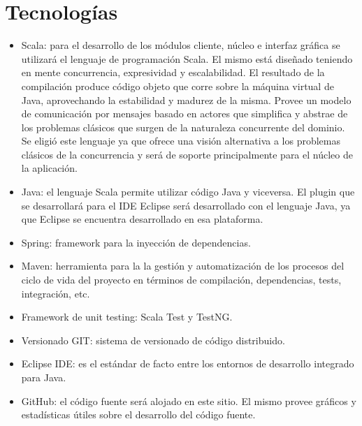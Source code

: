 \documentclass[12pt,a4paper]{article}
\begin{document}
	\section{Tecnologías}
	
	\begin{itemize}
	
	\item Scala: para el desarrollo de los módulos cliente, núcleo e interfaz gráfica se utilizará el lenguaje de programación Scala. El mismo está diseñado teniendo en mente concurrencia, expresividad y escalabilidad. El resultado de la compilación produce código objeto que corre sobre la máquina virtual de Java, aprovechando la estabilidad y madurez de la misma. Provee un modelo de comunicación por mensajes basado en actores que simplifica y abstrae de los problemas clásicos que surgen de la naturaleza concurrente del dominio.
Se eligió este lenguaje ya que ofrece una visión alternativa a los problemas clásicos de la concurrencia y será de soporte principalmente para el núcleo de la aplicación.

	\item Java: el lenguaje Scala permite utilizar código Java y viceversa. El plugin que se desarrollará para el IDE Eclipse será desarrollado con el lenguaje Java, ya que Eclipse se encuentra desarrollado en esa plataforma.

	\item Spring: framework para la inyección de dependencias.

	\item Maven: herramienta para la la gestión y automatización de los procesos del ciclo de vida del proyecto en términos de compilación, dependencias, tests, integración, etc.

	\item Framework de unit testing: Scala Test y TestNG.

	\item Versionado GIT: sistema de versionado de código distribuido.

	\item Eclipse IDE: es el estándar de facto entre los entornos de desarrollo integrado para Java.

	\item GitHub: el código fuente será alojado en este sitio. El mismo provee gráficos y estadísticas útiles sobre el desarrollo del código fuente.	

	\end{itemize}

	
\end{document}

